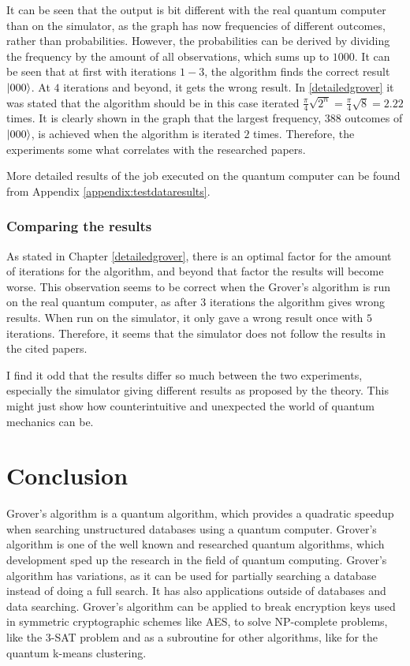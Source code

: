 \documentclass[english,oneside,openright]{UH_DS_report}
\begin{document}
It can be seen that the output is bit different with the real quantum computer than on the simulator, as the graph has now frequencies of different outcomes, rather than probabilities. However, the probabilities can be derived by dividing the frequency by the amount of all observations, which sums up to $1000$. It can be seen that at first with iterations $1 - 3$, the algorithm finds the correct result $\ket{000}$. At $4$ iterations and beyond, it gets the wrong result. In \ref{detailedgrover} it was stated that the algorithm should be in this case iterated $\frac{\pi}{4} \sqrt{2^{n}} = \frac{\pi}{4} \sqrt{8} = 2.22 $ times. It is clearly shown in the graph that the largest frequency, $388$ outcomes of $\ket{000}$, is achieved when the algorithm is iterated $2$ times. Therefore, the experiments some what correlates with the researched papers.

More detailed results of the job executed on the quantum computer can be found from Appendix \ref{appendix:testdataresults}.

\subsection{Comparing the results}
As stated in Chapter \ref{detailedgrover}, there is an optimal factor for the amount of iterations for the algorithm, and beyond that factor the results will become worse. This observation seems to be correct when the Grover's algorithm is run on the real quantum computer, as after $3$ iterations the algorithm gives wrong results. When run on the simulator, it only gave a wrong result once with $5$ iterations. Therefore, it seems that the simulator does not follow the results in the cited papers.

I find it odd that the results differ so much between the two experiments, especially the simulator giving different results as proposed by the theory. This might just show how counterintuitive and unexpected the world of quantum mechanics can be.

\chapter{Conclusion}
\label{chpater:conclusion}

Grover's algorithm is a quantum algorithm, which provides a quadratic speedup when searching unstructured databases using a quantum computer. Grover's algorithm is one of the well known and researched quantum algorithms, which development sped up the research in the field of quantum computing. Grover's algorithm has variations, as it can be used for partially searching a database instead of doing a full search. It has also applications outside of databases and data searching. Grover's algorithm can be applied to break encryption keys used in symmetric cryptographic schemes like AES, to solve NP-complete problems, like the 3-SAT problem and as a subroutine for other algorithms, like for the quantum k-means clustering.
\end{document}
